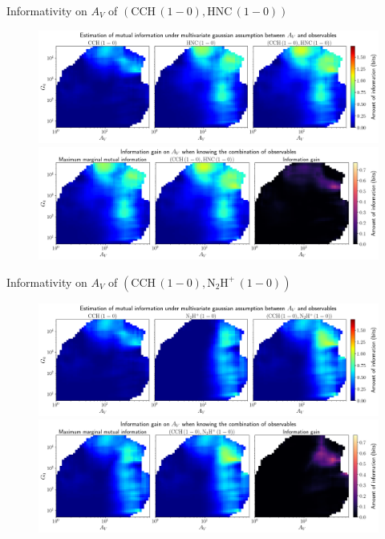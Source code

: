 \documentclass{beamer}
\begin{document}
\begin{frame}{Informativity on $A_V$ of $\left(\mathrm{CCH\,(1-0)},\mathrm{HNC\,(1-0)}\right)$}
    \begin{figure}
        \centering
        \includegraphics[width=0.95\linewidth]{../linearinfo/av__cch10_hnc10_linearinfo.png}
        \vfill
        \includegraphics[width=0.95\linewidth]{../linearinfo/av__cch10_hnc10_linearinfo_gain.png}
    \end{figure}
\end{frame}

\begin{frame}{Informativity on $A_V$ of $\left(\mathrm{CCH\,(1-0)},\mathrm{N_2H^+\,(1-0)}\right)$}
    \begin{figure}
        \centering
        \includegraphics[width=0.95\linewidth]{../linearinfo/av__cch10_n2hp10_linearinfo.png}
        \vfill
        \includegraphics[width=0.95\linewidth]{../linearinfo/av__cch10_n2hp10_linearinfo_gain.png}
    \end{figure}
\end{frame}
\end{document}
